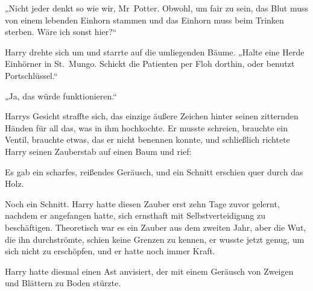 „Nicht jeder denkt so wie wir, Mr~Potter. Obwohl, um fair zu sein, das Blut muss von einem lebenden Einhorn stammen und das Einhorn muss beim Trinken sterben. Wäre ich sonst hier?“

Harry drehte sich um und starrte auf die umliegenden Bäume.
„Halte eine Herde Einhörner in St.~Mungo. Schickt die Patienten per Floh dorthin, oder benutzt Portschlüssel.“

„Ja, das würde funktionieren.“

Harrys Gesicht straffte sich, das einzige äußere Zeichen hinter seinen zitternden Händen für all das, was in ihm hochkochte. Er musste schreien, brauchte ein Ventil, brauchte etwas, das er nicht benennen konnte, und schließlich richtete Harry seinen Zauberstab auf einen Baum und rief: 

Es gab ein scharfes, reißendes Geräusch, und ein Schnitt erschien quer durch das Holz.


Noch ein Schnitt. Harry hatte diesen Zauber erst zehn Tage zuvor gelernt, nachdem er angefangen hatte, sich ernsthaft mit Selbstverteidigung zu beschäftigen. Theoretisch war es ein Zauber aus dem zweiten Jahr, aber die Wut, die ihn durchströmte, schien keine Grenzen zu kennen, er wusste jetzt genug, um sich nicht zu erschöpfen, und er hatte noch immer Kraft.

 Harry hatte diesmal einen Ast anvisiert, der mit einem Geräusch von Zweigen und Blättern zu Boden stürzte.

